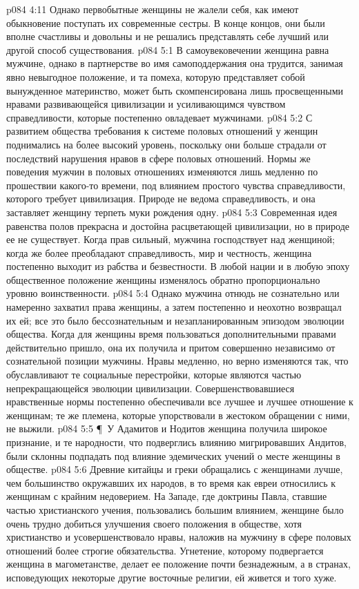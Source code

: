 \vs p084 4:11 Однако первобытные женщины не жалели себя, как имеют обыкновение поступать их современные сестры. В конце концов, они были вполне счастливы и довольны и не решались представлять себе лучший или другой способ существования.
\vs p084 5:1 В самоувековечении женщина равна мужчине, однако в партнерстве во имя самоподдержания она трудится, занимая явно невыгодное положение, и та помеха, которую представляет собой вынужденное материнство, может быть скомпенсирована лишь просвещенными нравами развивающейся цивилизации и усиливающимся чувством справедливости, которые постепенно овладевает мужчинами.
\vs p084 5:2 С развитием общества требования к системе половых отношений у женщин поднимались на более высокий уровень, поскольку они больше страдали от последствий нарушения нравов в сфере половых отношений. Нормы же поведения мужчин в половых отношениях изменяются лишь медленно по прошествии какого\hyp{}то времени, под влиянием простого чувства справедливости, которого требует цивилизация. Природе не ведома справедливость, и она заставляет женщину терпеть муки рождения одну.
\vs p084 5:3 Современная идея равенства полов прекрасна и достойна расцветающей цивилизации, но в природе ее не существует. Когда прав сильный, мужчина господствует над женщиной; когда же более преобладают справедливость, мир и честность, женщина постепенно выходит из рабства и безвестности. В любой нации и в любую эпоху общественное положение женщины изменялось обратно пропорционально уровню воинственности.
\vs p084 5:4 Однако мужчина отнюдь не сознательно или намеренно захватил права женщины, а затем постепенно и неохотно возвращал их ей; все это было бессознательным и незапланированным эпизодом эволюции общества. Когда для женщины время пользоваться дополнительными правами действительно пришло, она их получила и притом совершенно независимо от сознательной позиции мужчины. Нравы медленно, но верно изменяются так, что обуславливают те социальные перестройки, которые являются частью непрекращающейся эволюции цивилизации. Совершенствовавшиеся нравственные нормы постепенно обеспечивали все лучшее и лучшее отношение к женщинам; те же племена, которые упорствовали в жестоком обращении с ними, не выжили.
\vs p084 5:5 \P\ У Адамитов и Нодитов женщина получила широкое признание, и те народности, что подверглись влиянию мигрировавших Андитов, были склонны подпадать под влияние эдемических учений о месте женщины в обществе.
\vs p084 5:6 Древние китайцы и греки обращались с женщинами лучше, чем большинство окружавших их народов, в то время как евреи относились к женщинам с крайним недоверием. На Западе, где доктрины Павла, ставшие частью христианского учения, пользовались большим влиянием, женщине было очень трудно добиться улучшения своего положения в обществе, хотя христианство и усовершенствовало нравы, наложив на мужчину в сфере половых отношений более строгие обязательства. Угнетение, которому подвергается женщина в магометанстве, делает ее положение почти безнадежным, а в странах, исповедующих некоторые другие восточные религии, ей живется и того хуже.
